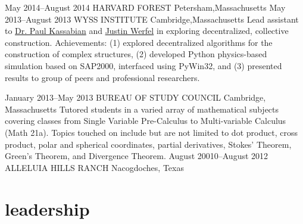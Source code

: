 \documentclass[]{friggeri-cv} %
\begin{document}
\entry
{May 2014--August 2014}
{HARVARD FOREST}
{Petersham,Massachusetts}
{}
\entry
{May 2013--August 2013}
{WYSS INSTITUTE}
{Cambridge,Massachusetts}
{ 
{Lead assistant to \href{mailto:pekassabian@sgh.com}{Dr. Paul Kassabian} and \href{jkwerfel@seas.harvard.edu}{Justin Werfel} in exploring decentralized, collective construction. Achievements: (1) explored decentralized algorithms for the construction of complex structures, (2) developed Python physics-based simulation based on SAP2000, interfaced using PyWin32, and (3) presented results to group of peers and professional researchers. 
}}
\begin{detailed}
\entry
{January 2013--May 2013}
{BUREAU OF STUDY COUNCIL}
{Cambridge, Massachusetts}
{
{Tutored students in a varied array of mathematical subjects covering classes from Single Variable Pre-Calculus to Multi-variable Calculus (Math 21a). Topics touched on include but are not limited to dot product, cross product, polar and spherical coordinates, partial derivatives, Stokes' Theorem, Green's Theorem, and Divergence Theorem.}}
\entry
{August 20010--August 2012}
{ALLELUIA HILLS RANCH}
{Nacogdoches, Texas}
{}
\end{detailed}


\section{leadership}
\end{document}
